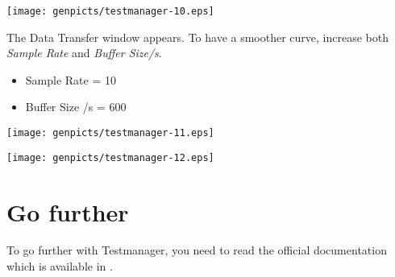 \begin{itemize}
\begin{center}
\texttt{[image: genpicts/testmanager-10.eps]}
\end{center}

The Data Transfer window appears.  To have a smoother
curve, increase both \textit{Sample Rate} and \textit{Buffer Size/s}.
\begin{itemize}
\item Sample Rate = 10
\item Buffer Size /s = 600
\end{itemize}

\begin{center}
\texttt{[image: genpicts/testmanager-11.eps]}
\end{center}



\begin{center}
\texttt{[image: genpicts/testmanager-12.eps]}
\end{center}

\section{Go further}
To go further with Testmanager, you need to read the official
documentation which is available in \cite{testmanager_user_manual}.

\end{itemize}
